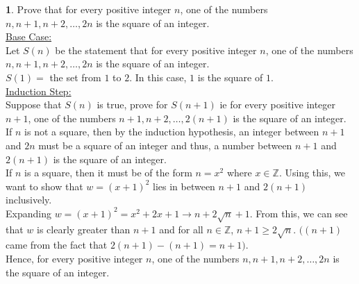 \documentclass[12pt,a4paper]{article}
\newcommand{\Z}{\mathbb{Z}}
\theoremstyle{definition}
\newtheorem{problem}{}
\begin{document}
\begin{problem}
Prove that for every positive integer $n$, one of the numbers $n, n+1, n+2, \ldots , 2n$ is the square of an integer. \\

\underline{Base Case:} \\
Let $S(n)$ be the statement that for every positive integer $n$, one of the numbers $n, n+1, n+2, \ldots , 2n$ is the square of an integer.\\
$S(1) =$ the set from $1$ to $2$. In this case, $1$ is the square of $1$.\\

\underline{Induction Step:} \\
Suppose that $S(n)$ is true, prove for $S(n + 1)$ ie for every positive integer $n + 1$, one of the numbers $n + 1, n + 2, \ldots, 2(n + 1)$ is the square of an integer. \\

If $n$ is not a square, then by the induction hypothesis, an integer between $n + 1$ and $2n$ must be a square of an integer and thus, a number between $n + 1$ and $2(n + 1)$ is the square of an integer. \\

If $n$ is a square, then it must be of the form $n = x^2$ where $x \in \Z$. Using this, we want to show that $w = (x + 1)^2$ lies in between $n + 1$ and $2(n + 1)$ inclusively. \\

Expanding $w = (x + 1)^2 = x^2 + 2x + 1 \rightarrow n + 2\sqrt{n} + 1$. From this, we can see that $w$ is clearly greater than $n + 1$ and for all $n \in \Z$, $n + 1 \geq 2\sqrt{n}$. $((n + 1)$ came from the fact that $2(n + 1) - (n + 1) = n + 1)$. \\

Hence, for every positive integer $n$, one of the numbers $n, n+1, n+2, \ldots , 2n$ is the square of an integer.

\end{problem}
\end{document}
